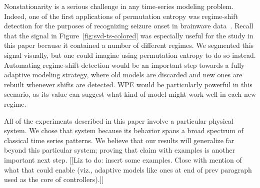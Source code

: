 Nonstationarity is a serious challenge in any time-series modeling
problem.  Indeed, one of the first applications of permutation entropy
was regime-shift detection for the purposes of recognizing seizure
onset in brainwave data~\cite{cao2004det}.  Recall that the signal in
Figure~\ref{fig:svd-ts-colored} was especially useful for the study in
this paper because it contained a number of different regimes.  We
segmented this signal visually, but one could imagine using
permutation entropy to do so instead.  Automating regime-shift
detection would be an important step towards a fully adaptive modeling
strategy, where old models are discarded and new ones are rebuilt
whenever shifts are detected.  WPE would be particularly powerful in
this scenario, as its value can suggest what kind of model might work
well in each new regime.

All of the experiments described in this paper involve a particular
physical system.  We chose that system because its behavior spans a
broad spectrum of classical time series patterns.  We believe that our
results will generalize far beyond this particular system; proving
that claim with examples is another important next step.  [[Liz to do:
    insert some examples.  Close with mention of what that could
    enable (viz., adaptive models like ones at end of prev paragraph
    used as the core of controllers).]]

